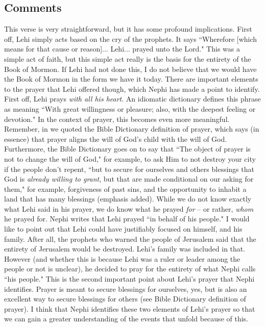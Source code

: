 \documentclass[12pt]{report}
\begin{document}
\subsection{Comments\label{1Nephi1:5:comments}}
This verse is very straightforward, but it has some profound implications.  First off, Lehi simply acts based on the cry of the prophets.  It says ``Wherefore [which means for that cause or reason]... Lehi... prayed unto the Lord."  This was a simple act of faith, but this simple act really is the basis for the entirety of the Book of Mormon.  If Lehi had not done this, I do not believe that we would have the Book of Mormon in the form we have it today.  There are important elements to the prayer that Lehi offered though, which Nephi has made a point to identify.  First off, Lehi prays \emph{with all his heart}.  An idiomatic dictionary defines this phrase as meaning ``With great willingness or pleasure; also, with the deepest feeling or devotion." In the context of prayer, this becomes even more meaningful.  Remember, in  we quoted the Bible Dictionary definition of prayer, which says (in essence) that prayer aligns the will of God's child with the will of God.  Furthermore, the Bible Dictionary goes on to say that ``The object of prayer is not to change the will of God," for example, to ask Him to not destroy your city if the people don't repent, ``but to secure for ourselves and others blessings that God is \emph{already willing to grant}, but that are made conditional on our asking for them," for example, forgiveness of past sins, and the opportunity to inhabit a land that has many blessings (emphasis added).  While we do not know exactly what Lehi said in his prayer, we do know what he prayed \emph{for} -- or rather, \emph{whom} he prayed for.  Nephi writes that Lehi prayed ``in behalf of his people."  I would like to point out that Lehi could have justifiably focused on himself, and his family.  After all, the prophets who warned the people of Jerusalem said that the entirety of Jerusalem would be destroyed. Lehi's family was included in that.  However (and whether this is because Lehi was a ruler or leader among the people or not is unclear), he decided to pray for the entirety of what Nephi calls ``his people."  This is the second important point about Lehi's prayer that Nephi identifies.  Prayer is meant to secure blessings for ourselves, yes, but is also an excellent way to secure blessings for others (see Bible Dictionary definition of prayer).  I think that Nephi identifies these two elements of Lehi's prayer so that we can gain a greater understanding of the events that unfold because of this.
\end{document}
